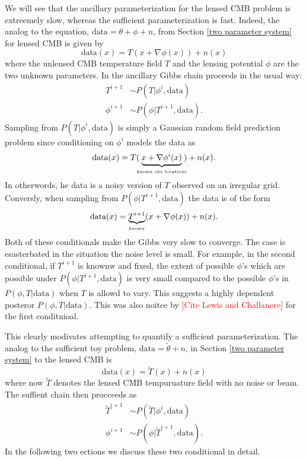 \documentclass[noinfoline]{imsart}
\begin{document}
We will see that the ancillary parameterization for the lensed CMB problem is extreemely slow, whereas the sufficient parameterization is fast. Indeed, the analog to the equation, $\text{data} = \theta +\phi + n$,  from Section \ref{two parameter system} for lensed CMB is given by
\[\text{data}(x) = T(x+\nabla \phi(x)) + n(x)\]
where the unlensed  CMB temperature field $T$ and the lensing potential $\phi$ are the two unknown parameters. In the ancillary Gibbs chain proceeds in the usual way:
\begin{align}
T^{i+1}&\sim P(T |  \phi^{i},\text{data})\\
\phi^{i+1}&\sim P(\phi | T^{i+1},  \text{data}).
\end{align}
Sampling from $P(T |  \phi^{i},\text{data})$ is simply a Gaussian random field prediction problem since conditioning on $\phi^i$ models the data as
\[ \text{data}(x) = T(\!\!\underbrace{x+\nabla\phi^i(x)}_\text{\tiny known obs locations}\!\!) + n(x).\]
In otherwords, he data is a noisy version of  $T$ observed on an irregular grid. 
Conversly, when sampling from $P(\phi |  T^{i+1},\text{data})$ the data is of the form
\[ \text{data}(x) = \underbrace{T^{i+1}}_{\text{\tiny known}}(x+\nabla\phi(x)) + n(x). \]
Both of these conditionals make the Gibbs very slow to converge. The case is esasterbated in the situation the noise level is small. For example, in the second conditional, if $T^{i+1}$ is knownw and fixed, the extent of possible  $\phi$'s which are possible under $P(\phi|T^{i+1},\text{data})$  is very small compared to the possible $\phi$'s  in $P(\phi, T| \text{data})$ when $T$ is allowd to vary. 
This suggests a highly dependent posteror $P(\phi, T| \text{data})$. 
This was also noitce by \textcolor{red}{[Cite Lewis and Challanore]} for the first conditnioal.

This clearly modivates attempting to quantify a  sufficient parameterization. The analog to the sufficient toy problem, $\text{data} = \widetilde\theta + n$,  in Section \ref{two parameter system} to the lensed CMB is 
\[\text{data}(x) = \widetilde T(x) + n(x)\]
where now $\widetilde T$ denotes the lensed CMB tempuruature field with no noise or beam.
The suffient chain then procceeds as
\begin{align}
\widetilde T^{i+1}&\sim P(\widetilde T |  \phi^{i},\text{data})\\
\phi^{i+1}&\sim P(\phi | \widetilde T^{i+1},  \text{data}).
\end{align}
In the following two ections we discuss these two conditional in detail.
\end{document}
